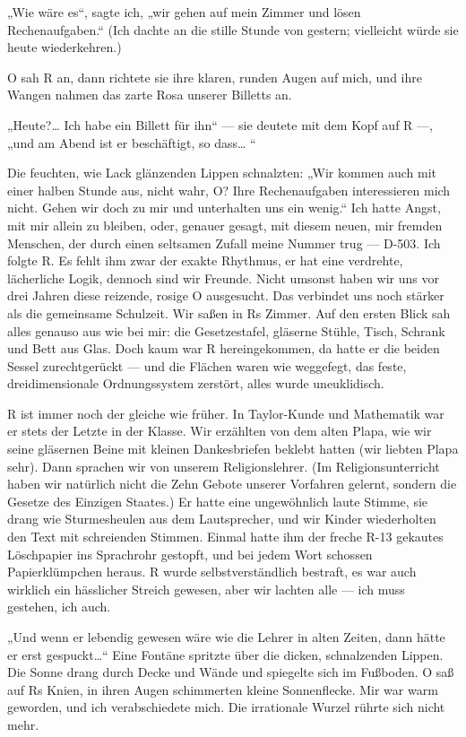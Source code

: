 „Wie wäre es“, sagte ich, „wir gehen auf mein Zimmer und lösen
Rechenaufgaben.“ (Ich dachte an die stille Stunde von gestern;
vielleicht würde sie heute wiederkehren.)

O sah R an, dann richtete sie ihre klaren, runden Augen auf mich,
und ihre Wangen nahmen das zarte Rosa unserer Billetts an.

„Heute?\ldots{} Ich habe ein Billett für ihn“ — sie deutete mit dem Kopf
auf R —, „und am Abend ist er beschäftigt, so dass\ldots{} “

Die feuchten, wie Lack glänzenden Lippen schnalzten: „Wir kommen
auch mit einer halben Stunde aus, nicht wahr, O? Ihre
Rechenaufgaben interessieren mich nicht. Gehen wir doch zu mir und
unterhalten uns ein wenig.“ Ich hatte Angst, mit mir allein zu
bleiben, oder, genauer gesagt, mit diesem neuen, mir fremden
Menschen, der durch einen seltsamen Zufall meine Nummer trug —
D-503. Ich folgte R. Es fehlt ihm zwar der exakte Rhythmus, er hat
eine verdrehte, lächerliche Logik, dennoch sind wir Freunde. Nicht
umsonst haben wir uns vor drei Jahren diese reizende, rosige O
ausgesucht. Das verbindet uns noch stärker als die gemeinsame
Schulzeit. Wir saßen in Rs Zimmer. Auf den ersten Blick sah alles
genauso aus wie bei mir: die Gesetzestafel, gläserne Stühle, Tisch,
Schrank und Bett aus Glas. Doch kaum war R hereingekommen, da hatte
er die beiden Sessel zurechtgerückt — und die Flächen waren wie
weggefegt, das feste, dreidimensionale Ordnungssystem zerstört,
alles wurde uneuklidisch.

R ist immer noch der gleiche wie früher. In Taylor-Kunde und
Mathematik war er stets der Letzte in der Klasse. Wir erzählten von
dem alten Plapa, wie wir seine gläsernen Beine mit kleinen
Dankesbriefen beklebt hatten (wir liebten Plapa sehr). Dann
sprachen wir von unserem Religionslehrer. (Im Religionsunterricht
haben wir natürlich nicht die Zehn Gebote unserer Vorfahren
gelernt, sondern die Gesetze des Einzigen Staates.) Er hatte eine
ungewöhnlich laute Stimme, sie drang wie Sturmesheulen aus dem
Lautsprecher, und wir Kinder wiederholten den Text mit schreienden
Stimmen. Einmal hatte ihm der freche R-13 gekautes Löschpapier ins
Sprachrohr gestopft, und bei jedem Wort schossen Papierklümpchen
heraus. R wurde selbstverständlich bestraft, es war auch wirklich
ein hässlicher Streich gewesen, aber wir lachten alle — ich muss
gestehen, ich auch.

„Und wenn er lebendig gewesen wäre wie die Lehrer in alten Zeiten,
dann hätte er erst gespuckt\ldots{}“ Eine Fontäne spritzte über die
dicken, schnalzenden Lippen. Die Sonne drang durch Decke und Wände
und spiegelte sich im Fußboden. O saß auf Rs Knien, in ihren Augen
schimmerten kleine Sonnenflecke. Mir war warm geworden, und ich
verabschiedete mich. Die irrationale Wurzel rührte sich nicht
mehr.

